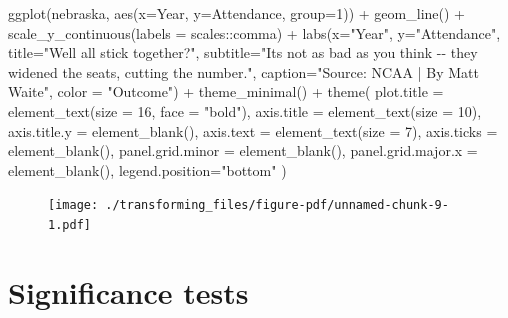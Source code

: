 \documentclass[
  letterpaper,
  DIV=11,
  numbers=noendperiod]{scrreprt}
\newenvironment{Shaded}{\begin{snugshade}}{\end{snugshade}}
\newcommand{\AttributeTok}[1]{\textcolor[rgb]{0.40,0.45,0.13}{#1}}
\newcommand{\DecValTok}[1]{\textcolor[rgb]{0.68,0.00,0.00}{#1}}
\newcommand{\FunctionTok}[1]{\textcolor[rgb]{0.28,0.35,0.67}{#1}}
\newcommand{\NormalTok}[1]{\textcolor[rgb]{0.00,0.23,0.31}{#1}}
\newcommand{\SpecialCharTok}[1]{\textcolor[rgb]{0.37,0.37,0.37}{#1}}
\newcommand{\StringTok}[1]{\textcolor[rgb]{0.13,0.47,0.30}{#1}}
\begin{document}
\begin{Shaded}
\begin{Highlighting}[]
\FunctionTok{ggplot}\NormalTok{(nebraska, }\FunctionTok{aes}\NormalTok{(}\AttributeTok{x=}\NormalTok{Year, }\AttributeTok{y=}\NormalTok{Attendance, }\AttributeTok{group=}\DecValTok{1}\NormalTok{)) }\SpecialCharTok{+} 
  \FunctionTok{geom\_line}\NormalTok{() }\SpecialCharTok{+} 
  \FunctionTok{scale\_y\_continuous}\NormalTok{(}\AttributeTok{labels =}\NormalTok{ scales}\SpecialCharTok{::}\NormalTok{comma) }\SpecialCharTok{+} 
  \FunctionTok{labs}\NormalTok{(}\AttributeTok{x=}\StringTok{"Year"}\NormalTok{, }\AttributeTok{y=}\StringTok{"Attendance"}\NormalTok{, }\AttributeTok{title=}\StringTok{"We\textquotesingle{}ll all stick together?"}\NormalTok{, }\AttributeTok{subtitle=}\StringTok{"It\textquotesingle{}s not as bad as you think {-}{-} they widened the seats, cutting the number."}\NormalTok{, }\AttributeTok{caption=}\StringTok{"Source: NCAA | By Matt Waite"}\NormalTok{, }\AttributeTok{color =} \StringTok{"Outcome"}\NormalTok{) }\SpecialCharTok{+}
  \FunctionTok{theme\_minimal}\NormalTok{() }\SpecialCharTok{+} 
  \FunctionTok{theme}\NormalTok{(}
    \AttributeTok{plot.title =} \FunctionTok{element\_text}\NormalTok{(}\AttributeTok{size =} \DecValTok{16}\NormalTok{, }\AttributeTok{face =} \StringTok{"bold"}\NormalTok{),}
    \AttributeTok{axis.title =} \FunctionTok{element\_text}\NormalTok{(}\AttributeTok{size =} \DecValTok{10}\NormalTok{),}
    \AttributeTok{axis.title.y =} \FunctionTok{element\_blank}\NormalTok{(),}
    \AttributeTok{axis.text =} \FunctionTok{element\_text}\NormalTok{(}\AttributeTok{size =} \DecValTok{7}\NormalTok{),}
    \AttributeTok{axis.ticks =} \FunctionTok{element\_blank}\NormalTok{(),}
    \AttributeTok{panel.grid.minor =} \FunctionTok{element\_blank}\NormalTok{(),}
    \AttributeTok{panel.grid.major.x =} \FunctionTok{element\_blank}\NormalTok{(),}
    \AttributeTok{legend.position=}\StringTok{"bottom"}
\NormalTok{  )}
\end{Highlighting}
\end{Shaded}

\begin{figure}[H]

{\centering \texttt{[image: ./transforming\_files/figure-pdf/unnamed-chunk-9-1.pdf]}

}

\end{figure}


\hypertarget{significance-tests}{%
\chapter{Significance tests}\label{significance-tests}}
\end{document}
